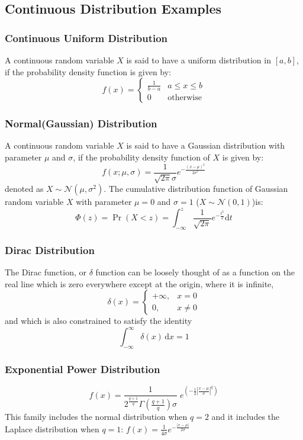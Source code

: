 \documentclass[11pt]{article}
\def\MN{{\mathcal N}}
\begin{document}
\subsection{Continuous Distribution Examples}
\subsubsection{Continuous Uniform Distribution}
A continuous random variable $X$ is said to have a uniform distribution in $[a,b]$, 
if the probability density function is given by:
\[ f(x)=\begin{cases}
  \frac{1}{b - a} &  a \leq x \leq b \\
  0 & \mathrm{otherwise}
  \end{cases} \]

\subsubsection{Normal(Gaussian) Distribution}
A continuous random variable $X$ is said to have a Gaussian distribution with parameter $\mu$ and $\sigma$, if the probability density function of $X$ is given by:
\[f(x; \mu, \sigma) = \frac{1}{\sqrt{2\pi}\sigma} e^{-\frac{(x-\mu)^2}{2\sigma^2}}\]
denoted as $X\sim \MN(\mu, \sigma^2)$. The cumulative distribution function of Gaussian random variable $X$ with parameter $\mu = 0$ and $\sigma = 1$ ($X\sim \MN(0,1)$)is:
\[\Phi(z) = \Pr(X < z) = \int_{-\infty}^z \frac{1}{\sqrt{2\pi}} e^{-\frac{t^2}{2}} \mathrm dt\]

\subsubsection{Dirac Distribution}
The Dirac function, or $\delta$ function can be loosely thought of as a function on the real line which is zero everywhere except at the origin, where it is infinite,
$$\delta(x) = \begin{cases} +\infty, & x = 0 \\ 0, & x \ne 0 \end{cases}$$
and which is also constrained to satisfy the identity
$$\int_{-\infty}^\infty \delta(x) \, \mathrm dx = 1$$
\subsubsection{Exponential Power Distribution}
$$
f(x)=\frac{1}{2^{\frac{q+1}{q}}\Gamma(\frac{q+1}{q})\sigma} \; e^{\left(-\frac{1}{2}|\frac{x-\mu}{\sigma}|^q\right)}
$$
This family includes the normal distribution when $q=2$ and it includes the Laplace distribution when $q=1$: $f(x)=\frac{1}{4\sigma} e^{-\frac{|x-\mu|}{2\sigma}}$
\end{document}
